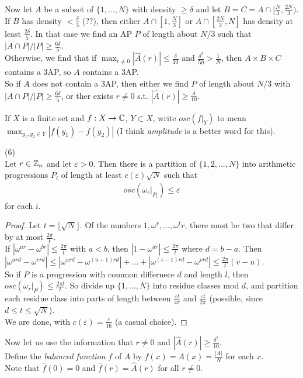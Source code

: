 \documentclass[a4paper]{article}
\begin{document}
Now let $A$ be a subset of $\{1,...,N\}$ with density $\geq \delta$ and let $B=C=A \cap [\frac{N}{3},\frac{2N}{3})$. If $B$ has density $<\frac{\delta}{5}$ (??), then either $A \cap [1,\frac{N}{3}]$ or $A \cap [\frac{2N}{3},N]$ has density at least $\frac{2\delta}{5}$. In that case we find an AP $P$ of length about $N/3$ such that $|A \cap P| / |P| \geq \frac{6\delta}{5}$.\\
Otherwise, we find that if $\max_{r \neq 0}|\hat{A}(r)| \leq \frac{\delta}{10}$ and $\frac{\delta^3}{50} > \frac{1}{N}$, then $A \times B \times C$ contains a 3AP, so $A$ contains a 3AP.\\
So if $A$ does not contain a 3AP, then either we find $P$ of length about $N/3$ with $|A\cap P| / |P| \geq \frac{6\delta}{5}$, or ther exists $r \neq 0$ s.t. $|\hat{A}(r)| \geq \frac{\delta}{10}$.

\begin{defi}
    If $X$ is a finite set and $f:X \to \mathbb{C}$, $Y \subset X$, write $osc(f|_Y)$ to mean $\max_{y_1,y_2 \in Y} |f(y_1)-f(y_2)|$ (I think \emph{amplitude} is a better word for this).
\end{defi}

\begin{lemma} (6)\\
    Let $r \in \mathbb{Z}_n$ and let $\varepsilon > 0$. Then there is a partition of $\{1,2,...,N\}$ into arithmetic progressions $P_i$ of length at least $c(\varepsilon)\sqrt{N}$ such that
    \begin{equation*}
        \begin{aligned}
            osc(\omega_r|_{P_i}) \leq \varepsilon
        \end{aligned}
    \end{equation*}
    for each $i$.
    \begin{proof}
        Let $t = \lfloor \sqrt{N}\rfloor$. Of the numbers $1,\omega^r,...,\omega^tr$, there must be two that differ by at most $\frac{2\pi}{t}$.\\
        If $|\omega^{ar}-\omega^{br}| \leq \frac{2\pi}{t}$ with $a < b$, then $|1-\omega^{dr}| \leq \frac{2\pi}{t}$ where $d=b-a$. Then $|\omega^{urd}-\omega^{vrd}| \leq |\omega^{urd}-\omega^{(u+1)rd}| + ... + |\omega^{(v-1)rd}-\omega^{vrd}| \leq \frac{2\pi}{t}(v-u)$.\\
        So if $P$ is a progression with common differnece $d$ and length $l$, then $osc(\omega_r|_P) \leq \frac{2\pi l}{t}$. So divide up $\{1,...,N\}$ into residue classes mod $d$, and partition each residue class into parts of length between $\frac{\varepsilon t}{4\pi}$ and $\frac{\varepsilon t}{2\pi}$ (possible, since $d \leq t \leq \sqrt{N}$).\\
        We are done, with $c(\varepsilon) = \frac{\varepsilon}{16}$ (a casual choice).
    \end{proof}
\end{lemma}
Now let us use the information that $r \neq 0$ and $|\hat{A}(r)| \geq \frac{\delta^2}{10}$.\\
Define the \emph{balanced function} $f$ of $A$ by $f(x) = A(x)=\frac{|A|}{N}$ for each $x$.\\
Note that $\hat{f}(0) = 0$ and $\hat{f}(r) = \hat{A}(r)$ for all $r \neq 0$.
\end{document}

